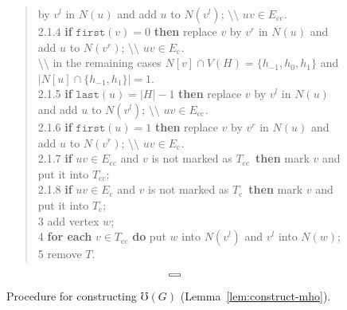 \documentclass[10pt]{article}
\def\boxit#1{\vbox{\hrule\hbox{\vrule\kern4pt
  \vbox{\kern1pt#1\kern1pt}
\kern2pt\vrule}\hrule}}
\newcommand{\head}[1]{\ensuremath{{\mathtt{last}(#1)}}}
\newcommand{\tail}[1]{\ensuremath{{\mathtt{first}(#1)}}}
\newcommand{\ec}{\ensuremath{E_{\text{c}}}}
\newcommand{\ecc}{\ensuremath{E_{\text{cc}}}}
\newcommand{\oc}{\ensuremath{T_{\text{c}}}}
\newcommand{\oo}{\ensuremath{T}}
\newcommand{\occ}{\ensuremath{T_{\text{cc}}}}
\newcommand{\comment}[1]{\hfill $\setminus\!\!\setminus$ {\em #1}}
\begin{document}
\begin{figure}[h!]
{\begin{quote}
  by $v^l$ in $N(u)$ and add $u$ to $N(v^l)$; \comment{$u v\in \ecc$.}
  \\
  2.1.4 \hspace*{5ex} {\bf if} $\tail{v} = 0$ {\bf then} replace $v$
  by $v^r$ in $N(u)$ and add $u$ to $N(v^r)$; \comment{$u v\in \ec$.}
  \\
  \hspace*{5ex} $\setminus\!\!\setminus$ in the remaining cases
  $N[v]\cap V(H) = \{h_{-1}, h_0, h_1\}$ and $|N[u] \cap \{h_{-1},
  h_1\}| = 1$.
  \\
  2.1.5 \hspace*{5ex} {\bf if} $\head{u} = |H| - 1$ {\bf then} replace
  $v$ by $v^l$ in $N(u)$ and add $u$ to $N(v^l)$; \comment{$u v\in
    \ecc$.}
  \\
  2.1.6 \hspace*{5ex} {\bf if} $\tail{u} = 1$ {\bf then} replace $v$
  by $v^r$ in $N(u)$ and add $u$ to $N(v^r)$; \comment{$u v\in \ec$.}
  \\
  2.1.7 \hspace*{5ex} {\bf if} $u v\in \ecc$ and $v$ is not marked as
  \occ\ {\bf then} mark $v$ and put it into \occ;
  \\
  2.1.8 \hspace*{5ex} {\bf if} $u v\in \ec$ and $v$ is not marked as
  \oc\ {\bf then} mark $v$ and put it into \oc;
  \\
  3 \hspace*{2ex} add vertex $w$;
  \\
  4 \hspace*{2ex} {\bf for each} $v\in \occ$ {\bf do} put $w$ into
  $N(v^l)$ and $v^l$ into $N(w)$;
  \\
  5 \hspace*{2ex} remove $\oo$.
\end{quote} \vspace*{-3mm} \strut} $$\boxit{\box4}$$
\vspace*{-7mm}
\caption{Procedure for constructing $\mho(G)$
  (Lemma~\ref{lem:construct-mho}).}
\label{fig:construct-omega-G}
\end{figure}
\end{document}
